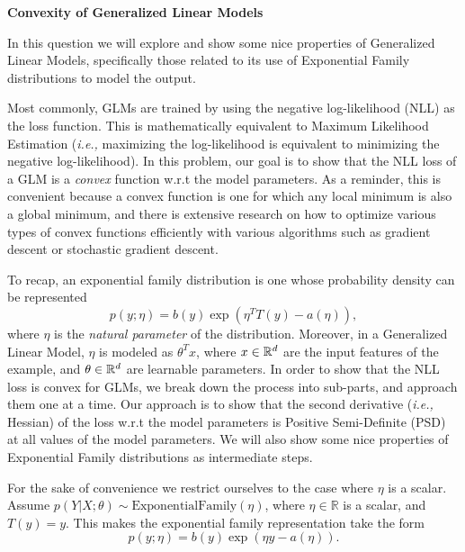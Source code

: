 \item {\bf Convexity of Generalized Linear Models}

In this question we will explore and show some nice properties of Generalized
Linear Models, specifically those related to its use of Exponential Family
distributions to model the output.

Most commonly, GLMs are trained by using the negative log-likelihood (NLL) as
the loss function. This is mathematically equivalent to Maximum Likelihood
Estimation (\emph{i.e.,} maximizing the log-likelihood is equivalent to
minimizing the negative log-likelihood). In this problem, our goal is to show
that the NLL loss of a GLM is a \textit{convex} function w.r.t the model parameters. As
a reminder, this is convenient because a convex function is one for which any
local minimum is also a global minimum, and there is extensive research on how
to optimize various types of convex functions efficiently with various algorithms
such as gradient descent or stochastic gradient descent. 

To recap, an exponential family distribution is one whose probability density
can be represented
%
\begin{equation*}
    p(y; \eta) = b(y)\exp(\eta^TT(y) - a(\eta)),
\end{equation*}
%
where $\eta$ is the \emph{natural parameter} of the distribution. Moreover, in
a Generalized Linear Model, $\eta$ is modeled as $\theta^Tx$, where $x \in
\mathbb{R}^{d}$ are the input features of the example, and $\theta \in
\mathbb{R}^{d}$ are learnable parameters. In order to show that the NLL loss is
convex for GLMs, we break down the process into sub-parts, and approach them
one at a time. Our approach is to show that the second derivative (\emph{i.e.,}
Hessian) of the loss w.r.t the model parameters is Positive Semi-Definite (PSD)
at all values of the model parameters. We will also show some nice properties
of Exponential Family distributions as intermediate steps.

For the sake of convenience we restrict ourselves to the case where $\eta$ is
a scalar. Assume $p(Y\vert X;\theta )\sim \text{ExponentialFamily}(\eta)$, where
$\eta \in\mathbb{R}$ is a scalar, and $T(y) = y$. This makes the exponential
family representation take the form
%
\begin{equation*}
    p(y ; \eta) = b(y)\exp(\eta y - a(\eta)).
\end{equation*}
%
\begin{enumerate}
    

    

    

\end{enumerate}

